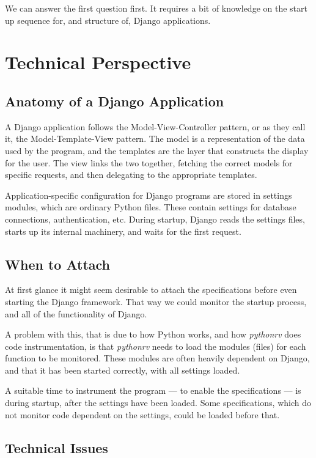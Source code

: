 \documentclass[a4paper,11pt]{kth-mag}
\begin{document}
We can answer the first question first. It requires a bit of knowledge on the
start up sequence for, and structure of, Django applications.


\section{Technical Perspective}


\subsection{Anatomy of a Django Application}

A Django application follows the Model-View-Controller pattern, or as they call
it, the Model-Template-View pattern. The model is a representation of the data
used by the program, and the templates are the layer that constructs the
display for the user. The view links the two together, fetching the correct
models for specific requests, and then delegating to the appropriate templates.

Application-specific configuration for Django programs are stored in settings
modules, which are ordinary Python files. These contain settings for database
connections, authentication, etc. During startup, Django reads the settings
files, starts up its internal machinery, and waits for the first request.


\subsection{When to Attach}

At first glance it might seem desirable to attach the specifications before
even starting the Django framework. That way we could monitor the startup
process, and all of the functionality of Django.

A problem with this, that is due to how Python works, and how \textit{pythonrv}
does code instrumentation, is that \textit{pythonrv} needs to load the modules
(files) for each function to be monitored. These modules are often heavily
dependent on Django, and that it has been started correctly, with all settings
loaded.

A suitable time to instrument the program --- to enable the specifications ---
is during startup, after the settings have been loaded. Some specifications,
which do not monitor code dependent on the settings, could be loaded before
that.


\subsection{Technical Issues}
\end{document}
